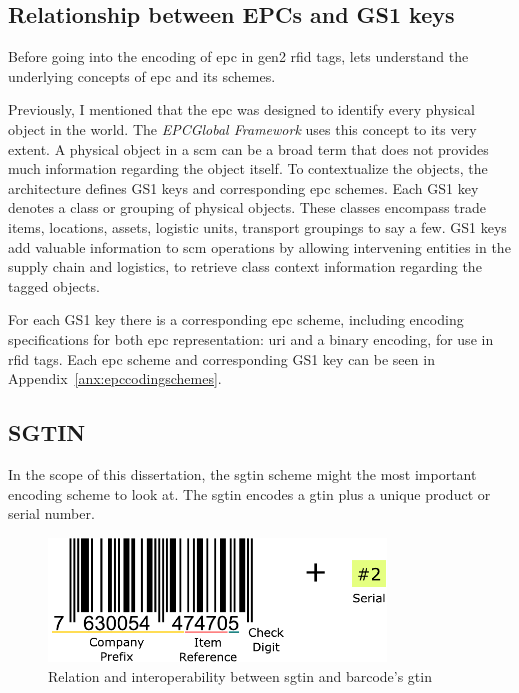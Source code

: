 \subsection{Relationship between EPCs and GS1 keys}

Before going into the encoding of \ac{epc} in \ac{gen2} \ac{rfid} tags, lets understand the underlying concepts of \ac{epc} and its schemes.

Previously, I mentioned that the \ac{epc} was designed to identify every physical object in the world.
The \emph{EPCGlobal Framework} uses this concept to its very extent.
A physical object in a \ac{scm} can be a broad term that does not provides much information regarding the object itself.
To contextualize the objects, the architecture defines GS1 keys and corresponding \ac{epc} schemes.
Each GS1 key denotes a class or grouping of physical objects. These classes encompass trade items, locations, assets, logistic units, transport groupings to say a few.
GS1 keys add valuable information to \ac{scm} operations by allowing intervening entities in the supply chain and logistics, to retrieve class context information regarding the tagged objects.

For each GS1 key there is a corresponding \ac{epc} scheme, including encoding specifications for both \ac{epc} representation: \ac{uri} and a binary encoding, for use in \ac{rfid} tags.
Each \ac{epc} scheme and corresponding GS1 key can be seen in Appendix~\ref{anx:epccodingschemes}.

\subsection{SGTIN} \label{sec:sgtin}

In the scope of this dissertation, the \ac{sgtin} scheme might the most important encoding scheme to look at.
The \ac{sgtin} encodes a \ac{gtin} plus a unique product or serial number.

\begin{figure}[!ht]
    \centering
    \includegraphics[width=0.8\textwidth]{./figs/02-state-of-the-art/SGTIN_UPC_Compare.pdf}
    \caption[Relation and interoperability between \ac{sgtin} and barcode's \ac{gtin}]{Relation and interoperability between \ac{sgtin} and barcode's \ac{gtin}} 
    \label{fig:barcodesgtin}
\end{figure}

